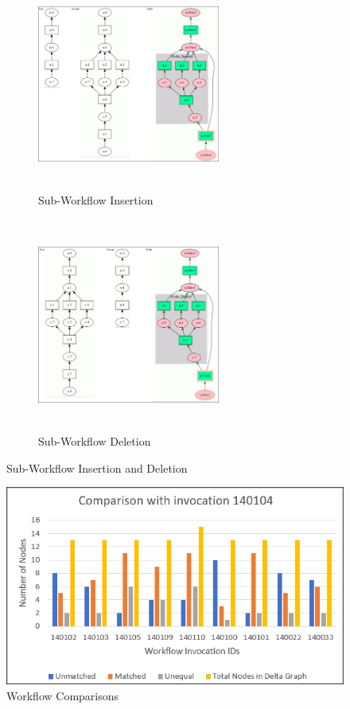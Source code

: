 \documentclass[10pt,conference,twocolumn]{IEEEtran}
\begin{document}
\begin{figure}
\centering
\begin{subfigure}{.50\textwidth}
  \centering
  \includegraphics[width=6cm,height=7cm]{DeltaSubGraphInsertion.png}
  \caption{Sub-Workflow Insertion}
  \label{fig:Sub-Workflow Insertion}
\end{subfigure}%
\begin{subfigure}{.50\textwidth}
    \centering
  \includegraphics[width=6cm,height=7cm]{DeltaSubGraphDeletion.png}
  \caption{Sub-Workflow Deletion}
  \label{fig:Sub-Workflow Deletion}
\end{subfigure}
\label{fig:test}
\caption{Sub-Workflow Insertion and Deletion}
\end{figure}

\begin{figure}
  \centering
  \includegraphics[scale=0.70]{WorkflowComparisons.png}
  \caption{Workflow Comparisons}
  \label{fig:Workflow Comparisons}
\end{figure}
\end{document}
